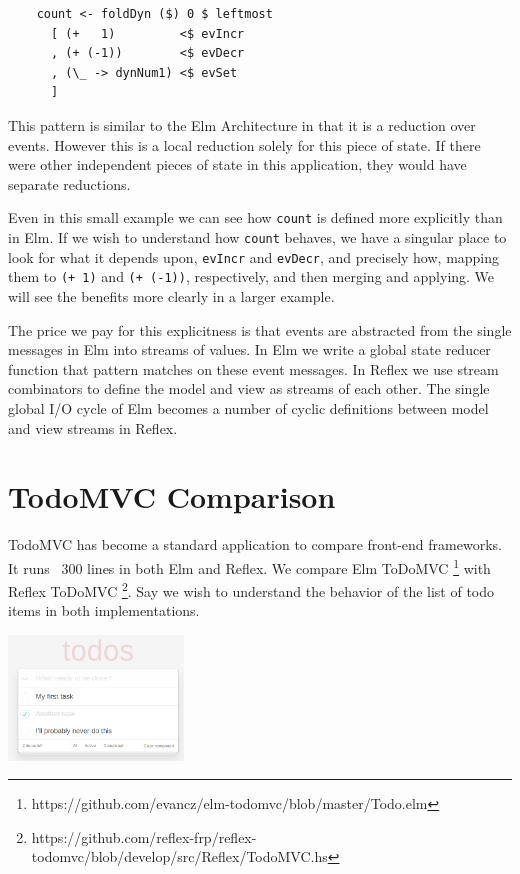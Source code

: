 \documentclass[sigconf]{acmart}
\begin{document}
\lstset{numbers=none}
\begin{lstlisting}
    count <- foldDyn ($) 0 $ leftmost 
      [ (+   1)         <$ evIncr
      , (+ (-1))        <$ evDecr
      , (\_ -> dynNum1) <$ evSet 
      ]  
\end{lstlisting}

This pattern is similar to the Elm Architecture in that it is a reduction over events. However this is a local reduction solely for this piece of state. If there were other independent pieces of state in this application, they would have separate reductions.

Even in this small example we can see how \lstinline{count} is defined more explicitly than in Elm. If we wish to understand how \lstinline{count} behaves, we have a singular place to look for what it depends upon, \lstinline{evIncr} and \lstinline{evDecr}, and precisely how, mapping them to \lstinline{(+ 1)} and \lstinline{(+ (-1))}, respectively, and then merging and applying. We will see the benefits more clearly in a larger example.

The price we pay for this explicitness is that events are abstracted from the single messages in Elm into streams of values. In Elm we write a global state reducer function that pattern matches on these event messages. In Reflex we use stream combinators to define the model and view as streams of each other. The single global I/O cycle of Elm becomes a number of cyclic definitions between model and view streams in Reflex.

\section{TodoMVC Comparison}

TodoMVC has become a standard application to compare front-end frameworks. It runs ~300 lines in both Elm and Reflex. We compare Elm ToDoMVC \footnote{https://github.com/evancz/elm-todomvc/blob/master/Todo.elm} with Reflex ToDoMVC \footnote{https://github.com/reflex-frp/reflex-todomvc/blob/develop/src/Reflex/TodoMVC.hs}. Say we wish to understand the behavior of the list of todo items in both implementations.\newline

\includegraphics[width=0.35\textwidth]{todomvc}\newline
\end{document}
